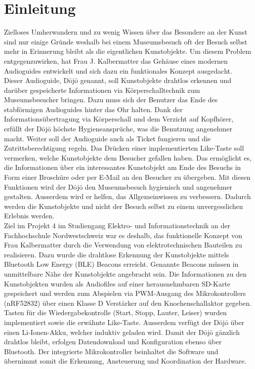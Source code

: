 \section{Einleitung}\label{sec:einleitung}
Zielloses Umherwandern und zu wenig Wissen über das Besondere an der Kunst sind nur einige Gründe weshalb bei einem Museumsbesuch oft der Besuch selbst mehr in Erinnerung bleibt als die eigentlichen Kunstobjekte. Um diesem Problem entgegenzuwirken, hat Frau J. Kalbermatter das Gehäuse eines modernen Audioguides entwickelt und sich dazu ein funktionales Konzept ausgedacht. Dieser Audioguide, Dōjō genannt, soll Kunstobjekte drahtlos erkennen und darüber gespeicherte Informationen via Körperschalltechnik zum Museumsbesucher bringen. Dazu muss sich der Benutzer das Ende des stabförmigen Audioguides hinter das Ohr halten. Dank der Informationsübertragung via Körperschall und dem Verzicht auf Kopfhörer, erfüllt der Dōjō höchste Hygieneansprüche, was die Benutzung angenehmer macht. Weiter soll der Audioguide auch als Ticket fungieren und die Zutrittsberechtigung regeln. Das Drücken einer implementierten \glqq Like\grqq-Taste soll vermerken, welche Kunstobjekte dem Besucher gefallen haben. Das ermöglicht es, die Informationen über ein interessantes Kunstobjekt am Ende des Besuchs in Form einer Broschüre oder per E-Mail an den Besucher zu übergeben. Mit diesen Funktionen wird der Dōjō den Museumsbesuch hygienisch und angenehmer gestalten. Ausserdem wird er helfen, das Allgemeinwissen zu verbessern. Dadurch werden die Kunstobjekte und nicht der Besuch selbst zu einem unvergesslichen Erlebnis werden.\\
Ziel im Projekt 4 im Studiengang Elektro- und Informationstechnik an der Fachhochschule Nordwestschweiz war es deshalb, das funktionelle Konzept von Frau Kalbermatter durch die Verwendung von elektrotechnischen Bauteilen zu realisieren. Dazu wurde die drahtlose Erkennung der Kunstobjekte mittels Bluetooth Low Energy (BLE) Beacons erreicht. Genannte Beacons müssen in unmittelbare Nähe der Kunstobjekte angebracht sein. Die Informationen zu den Kunstobjekten wurden als Audiofiles auf einer herausnehmbaren SD-Karte gespeichert und werden zum Abspielen via PWM-Ausgang des Mikrokontrollers (nRF52832) über einen Klasse D Verstärker auf den Knochenschallaktor gegeben. Tasten für die Wiedergabekontrolle (Start, Stopp, Lauter, Leiser) wurden implementiert sowie die erwähnte \glqq Like\grqq -Taste. Ausserdem verfügt der Dōjō über einen Li-Ionen-Akku, welcher induktiv geladen wird. Damit der Dōjō gänzlich drahtlos bleibt, erfolgen Datendownload und Konfiguration ebenso über Bluetooth. Der integrierte Mikrokontroller beinhaltet die Software und übernimmt somit die Erkennung, Ansteuerung und Koordination der Hardware.\\
